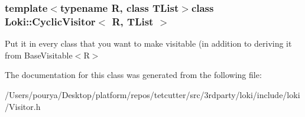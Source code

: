 \subsubsection*{template$<$typename R, class T\+List$>$class Loki\+::\+Cyclic\+Visitor$<$ R, T\+List $>$}

Put it in every class that you want to make visitable (in addition to deriving it from Base\+Visitable$<$\+R$>$ 

The documentation for this class was generated from the following file\+:\begin{DoxyCompactItemize}
\item 
/\+Users/pourya/\+Desktop/platform/repos/tetcutter/src/3rdparty/loki/include/loki/Visitor.\+h\end{DoxyCompactItemize}
